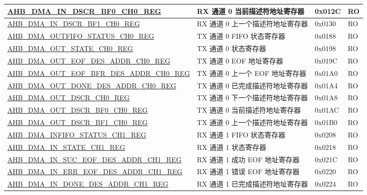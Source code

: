 \begin{longtable}{ | l | l | p{1.3cm} | l | }
\hyperref[regdesc:AHBDMAINDSCRBF0CHNREG]{AHB\_DMA\_IN\_DSCR\_BF0\_CH0\_REG} & RX 通道 0 当前描述符地址寄存器 & 0x012C & RO    \\ \hline
\hyperref[regdesc:AHBDMAINDSCRBF1CHNREG]{AHB\_DMA\_IN\_DSCR\_BF1\_CH0\_REG} & RX 通道 0 上一个描述符地址寄存器 & 0x0130 & RO    \\ \hline
\hyperref[regdesc:AHBDMAOUTFIFOSTATUSCHNREG]{AHB\_DMA\_OUTFIFO\_STATUS\_CH0\_REG} & TX 通道 0 FIFO 状态寄存器 & 0x0188 & RO    \\ \hline
\hyperref[regdesc:AHBDMAOUTSTATECHNREG]{AHB\_DMA\_OUT\_STATE\_CH0\_REG} & TX 通道 0 状态寄存器 & 0x0198 & RO    \\ \hline
\hyperref[regdesc:AHBDMAOUTEOFDESADDRCHNREG]{AHB\_DMA\_OUT\_EOF\_DES\_ADDR\_CH0\_REG} & TX 通道 0 EOF 地址寄存器 & 0x019C & RO    \\ \hline
\hyperref[regdesc:AHBDMAOUTEOFBFRDESADDRCHNREG]{AHB\_DMA\_OUT\_EOF\_BFR\_DES\_ADDR\_CH0\_REG} & TX 通道 0 上一个 EOF 地址寄存器 & 0x01A0 & RO    \\ \hline
\hyperref[regdesc:AHBDMAOUTDONEDESADDRCHNREG]{AHB\_DMA\_OUT\_DONE\_DES\_ADDR\_CH0\_REG} & TX 通道 0 已完成描述符地址寄存器 & 0x01A4 & RO    \\ \hline
\hyperref[regdesc:AHBDMAOUTDSCRCHNREG]{AHB\_DMA\_OUT\_DSCR\_CH0\_REG} & TX 通道 0 下一个描述符地址寄存器 & 0x01A8 & RO    \\ \hline
\hyperref[regdesc:AHBDMAOUTDSCRBF0CHNREG]{AHB\_DMA\_OUT\_DSCR\_BF0\_CH0\_REG} & TX 通道 0 当前描述符地址寄存器 & 0x01AC & RO    \\ \hline
\hyperref[regdesc:AHBDMAOUTDSCRBF1CHNREG]{AHB\_DMA\_OUT\_DSCR\_BF1\_CH0\_REG} & TX 通道 0 上一个描述符地址寄存器 & 0x01B0 & RO    \\ \hline
\hyperref[regdesc:AHBDMAINFIFOSTATUSCHNREG]{AHB\_DMA\_INFIFO\_STATUS\_CH1\_REG} & RX 通道 1 FIFO 状态寄存器 & 0x0208 & RO    \\ \hline
\hyperref[regdesc:AHBDMAINSTATECHNREG]{AHB\_DMA\_IN\_STATE\_CH1\_REG} & RX 通道 1 状态寄存器 & 0x0218 & RO    \\ \hline
\hyperref[regdesc:AHBDMAINSUCEOFDESADDRCHNREG]{AHB\_DMA\_IN\_SUC\_EOF\_DES\_ADDR\_CH1\_REG} & RX 通道 1 成功 EOF 地址寄存器 & 0x021C & RO    \\ \hline
\hyperref[regdesc:AHBDMAINERREOFDESADDRCHNREG]{AHB\_DMA\_IN\_ERR\_EOF\_DES\_ADDR\_CH1\_REG} & RX 通道 1 错误 EOF 地址寄存器 & 0x0220 & RO    \\ \hline
\hyperref[regdesc:AHBDMAINDONEDESADDRCHNREG]{AHB\_DMA\_IN\_DONE\_DES\_ADDR\_CH1\_REG} & RX 通道 1 已完成描述符地址寄存器 & 0x0224 & RO    \\ \hline

\end{longtable}
